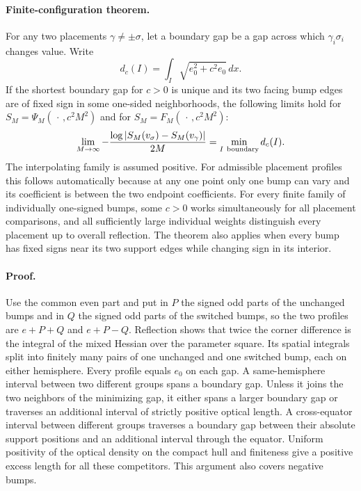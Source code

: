 \documentclass[11pt,letterpaper]{article}
\begin{document}
\paragraph{Finite-configuration theorem.}
For any two placements \(\gamma\ne\pm\sigma\), let a boundary gap be
a gap across which \(\gamma_i\sigma_i\) changes value. Write
\[
 d_c(I)=\int_I\sqrt{e_0^2+c^2e_0}\,dx .
\]
If the shortest boundary gap for \(c>0\) is unique and its two facing
bump edges are of fixed sign in some one-sided neighborhoods, the
following limits hold for \(S_M=\Psi_M(\,\cdot\,,c^2M^2)\) and for
\(S_M=F_M(\,\cdot\,,c^2M^2)\):
\[
 \lim_{M\to\infty}-\frac{\log|S_M(v_\sigma)-S_M(v_\gamma)|}{2M}
     =\min_{I\ {\rm boundary}} d_c(I).
\]
The interpolating family is assumed positive. For admissible
placement profiles this follows automatically because at any one
point only one bump can vary and its coefficient is between the
two endpoint coefficients. For every finite family of individually
one-signed bumps, some \(c>0\) works simultaneously for all placement
comparisons, and all sufficiently large individual weights distinguish
every placement up to overall reflection. The theorem also applies
when every bump has fixed signs near its two support edges while
changing sign in its interior.

\paragraph{Proof.}
Use the common even part and put in \(P\) the signed odd parts of the
unchanged bumps and in \(Q\) the signed odd parts of the switched
bumps, so the two profiles are \(e+P+Q\) and \(e+P-Q\).
Reflection shows that twice the corner difference is the integral of
the mixed Hessian over the parameter square. Its spatial integrals
split into finitely many pairs of one unchanged and one switched
bump, each on either hemisphere. Every profile equals \(e_0\) on each
gap. A same-hemisphere interval between two different groups spans
a boundary gap. Unless it joins the two neighbors of the minimizing
gap, it either spans a larger boundary gap or traverses an additional
interval of strictly positive optical length. A cross-equator interval
between different groups traverses a boundary gap between their
absolute support positions and an additional interval through the
equator. Uniform positivity of the optical density on the compact
hull and finiteness give a positive excess length for all these
competitors. This argument also covers negative bumps.
\end{document}
